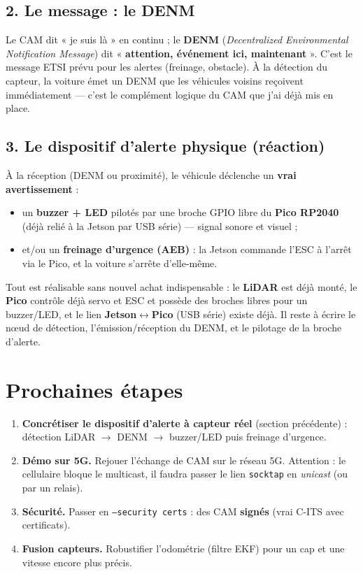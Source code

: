 \documentclass[a4paper,11pt]{article}
\newcommand{\code}[1]{\texttt{#1}}
\begin{document}
\subsection{2. Le message : le DENM}
Le CAM dit « je suis là » en continu ; le \textbf{DENM} (\emph{Decentralized Environmental
Notification Message}) dit « \textbf{attention, événement ici, maintenant} ». C'est le message
ETSI prévu pour les alertes (freinage, obstacle). À la détection du capteur, la voiture émet un
DENM que les véhicules voisins reçoivent immédiatement --- c'est le complément logique du CAM
que j'ai déjà mis en place.

\subsection{3. Le dispositif d'alerte physique (réaction)}
À la réception (DENM ou proximité), le véhicule déclenche un \textbf{vrai avertissement} :
\begin{itemize}[leftmargin=1.6em]
  \item un \textbf{buzzer + LED} pilotés par une broche GPIO libre du \textbf{Pico RP2040}
        (déjà relié à la Jetson par USB série) --- signal sonore et visuel ;
  \item et/ou un \textbf{freinage d'urgence (AEB)} : la Jetson commande l'ESC à l'arrêt via le
        Pico, et la voiture s'arrête d'elle-même.
\end{itemize}

\begin{note}
Tout est réalisable sans nouvel achat indispensable : le \textbf{LiDAR} est déjà monté, le
\textbf{Pico} contrôle déjà servo et ESC et possède des broches libres pour un buzzer/LED, et
le lien \textbf{Jetson$\leftrightarrow$Pico} (USB série) existe déjà. Il reste à écrire le nœud
de détection, l'émission/réception du DENM, et le pilotage de la broche d'alerte.
\end{note}

\section{Prochaines étapes}
\begin{enumerate}[leftmargin=1.6em]
  \item \textbf{Concrétiser le dispositif d'alerte à capteur réel} (section précédente) :
        détection LiDAR $\rightarrow$ DENM $\rightarrow$ buzzer/LED puis freinage d'urgence.
  \item \textbf{Démo sur 5G.} Rejouer l'échange de CAM sur le réseau 5G. Attention : le
        cellulaire bloque le multicast, il faudra passer le lien \code{socktap} en \emph{unicast}
        (ou par un relais).
  \item \textbf{Sécurité.} Passer en \code{--security certs} : des CAM \textbf{signés}
        (vrai C-ITS avec certificats).
  \item \textbf{Fusion capteurs.} Robustifier l'odométrie (filtre EKF) pour un cap et une
        vitesse encore plus précis.
\end{enumerate}
\end{document}
